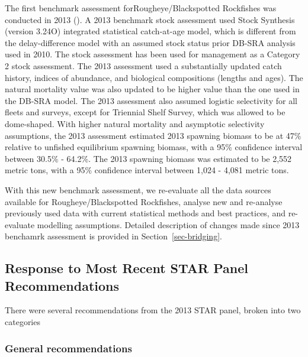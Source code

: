 \documentclass[
]{scrartcl}
\begin{document}
The first benchmark assessment forRougheye/Blackspotted Rockfishes was
conducted in 2013 (). A 2013 benchmark stock assessment used Stock Synthesis
(version 3.24O) integrated statistical catch-at-age model, which is
different from the delay-difference model with an assumed stock status
prior DB-SRA analysis used in 2010. The stock assessment has been used
for management as a Category 2 stock assessment. The 2013 assessment
used a substantially updated catch history, indices of abundance, and
biological compositions (lengths and ages). The natural mortality value
was also updated to be higher value than the one used in the DB-SRA
model. The 2013 assessment also assumed logistic selectivity for all
fleets and surveys, except for Triennial Shelf Survey, which was allowed
to be dome-shaped. With higher natural mortality and asymptotic
selectivity assumptions, the 2013 assessment estimated 2013 spawning
biomass to be at 47\% relative to unfished equilibrium spawning biomass,
with a 95\% confidence interval between 30.5\% - 64.2\%. The 2013
spawning biomass was estimated to be 2,552 metric tons, with a 95\%
confidence interval between 1,024 - 4,081 metric tons.

With this new benchmark assessment, we re-evaluate all the data sources
available for Rougheye/Blackspotted Rockfishes, analyse new and
re-analyse previously used data with current statistical methods and
best practices, and re-evaluate modelling assumptions. Detailed
description of changes made since 2013 benchamrk assessment is provided
in Section~\ref{sec-bridging}.

\subsection{Response to Most Recent STAR Panel
Recommendations}\label{response-to-most-recent-star-panel-recommendations}

There were several recommendations from the 2013 STAR panel, broken into
two categories

\subsubsection{General recommendations}\label{general-recommendations}
\end{document}
